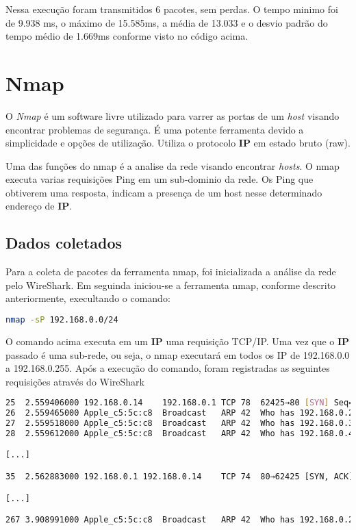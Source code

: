 \documentclass[a4paper]{report} %
\begin{document}
Nessa execução foram transmitidos 6 pacotes, sem perdas. O tempo minimo foi de 9.938 ms, o máximo de 15.585ms, a média de 13.033 e o desvio padrão do tempo médio de 1.669ms conforme visto no código acima.

\section{Nmap}
\label{sec_nmap}
O \textit{Nmap} é um software livre utilizado para varrer as portas de um \textit{host} visando encontrar problemas de segurança. É uma potente ferramenta devido a simplicidade e opções de utilização. Utiliza o protocolo \textbf{IP} em estado bruto (raw).

Uma das funções do nmap é a analise da rede visando encontrar \textit{hosts}. O nmap executa varias requisições Ping em um sub-dominio da rede. Os Ping que obtiverem uma resposta, indicam a presença de um host nesse determinado endereço de \textbf{IP}.


\subsection{Dados coletados}
\label{sub_nmap_dados}
Para a coleta de pacotes da ferramenta nmap, foi inicializada a análise da rede pelo WireShark. Em seguinda iniciou-se a ferramenta nmap, conforme descrito anteriormente, execultando o comando:

\begin{lstlisting}[language=bash]
nmap -sP 192.168.0.0/24
\end{lstlisting}

O comando acima executa em um \textbf{IP} uma requisição TCP/IP. Uma vez que o \textbf{IP} passado é uma sub-rede, ou seja, o nmap executará em todos os IP de 192.168.0.0 a 192.168.0.255. Após a execução do comando, foram registradas as seguintes requisições através do WireShark

\begin{lstlisting}[language=bash]
25	2.559406000	192.168.0.14	192.168.0.1	TCP	78	62425→80 [SYN] Seq=0 Win=65535 Len=0 MSS=1460 WS=32 TSval=875064134 TSecr=0 SACK_PERM=1
26	2.559465000	Apple_c5:5c:c8	Broadcast	ARP	42	Who has 192.168.0.2?  Tell 192.168.0.14
27	2.559518000	Apple_c5:5c:c8	Broadcast	ARP	42	Who has 192.168.0.3?  Tell 192.168.0.14
28	2.559612000	Apple_c5:5c:c8	Broadcast	ARP	42	Who has 192.168.0.4?  Tell 192.168.0.14

[...]

35	2.562883000	192.168.0.1	192.168.0.14	TCP	74	80→62425 [SYN, ACK] Seq=0 Ack=1 Win=17376 Len=0 MSS=1460 WS=1 TSval=79204428 TSecr=875064134

[...]

267	3.908991000	Apple_c5:5c:c8	Broadcast	ARP	42	Who has 192.168.0.254?  Tell 192.168.0.14
\end{lstlisting}
\end{document}
